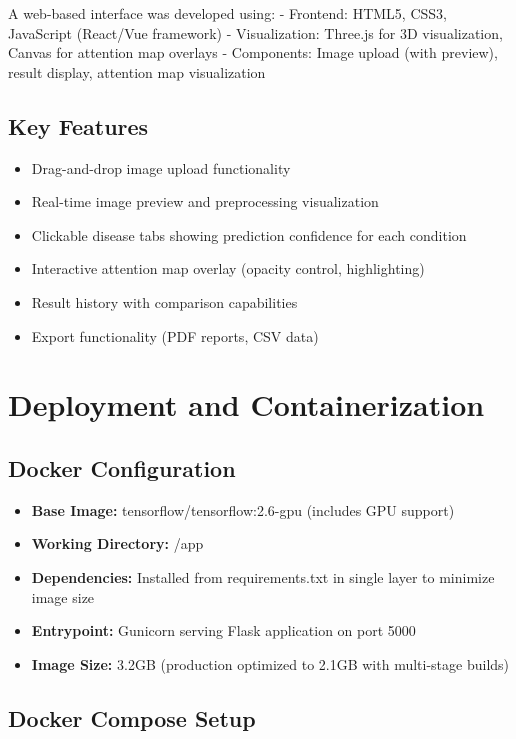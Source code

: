 {A web-based interface was developed using:
- Frontend: HTML5, CSS3, JavaScript (React/Vue framework)
- Visualization: Three.js for 3D visualization, Canvas for attention map overlays
- Components: Image upload (with preview), result display, attention map visualization

\subsection{Key Features}

\begin{itemize}
    \item Drag-and-drop image upload functionality
    \item Real-time image preview and preprocessing visualization
    \item Clickable disease tabs showing prediction confidence for each condition
    \item Interactive attention map overlay (opacity control, highlighting)
    \item Result history with comparison capabilities
    \item Export functionality (PDF reports, CSV data)
\end{itemize}

\section{Deployment and Containerization}

\subsection{Docker Configuration}

\begin{itemize}
    \item \textbf{Base Image:} tensorflow/tensorflow:2.6-gpu (includes GPU support)
    \item \textbf{Working Directory:} /app
    \item \textbf{Dependencies:} Installed from requirements.txt in single layer to minimize image size
    \item \textbf{Entrypoint:} Gunicorn serving Flask application on port 5000
    \item \textbf{Image Size:} 3.2GB (production optimized to 2.1GB with multi-stage builds)
\end{itemize}

\subsection{Docker Compose Setup}

}

